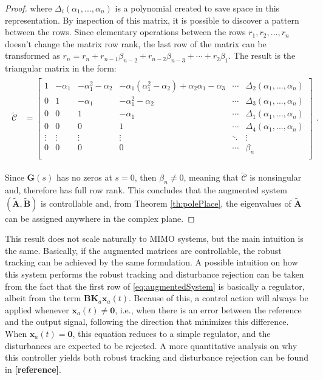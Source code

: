 \documentclass[a4paper,11pt]{book}
\numberwithin{figure}{chapter}
\numberwithin{equation}{chapter}
\numberwithin{table}{chapter}
\theoremstyle{definition}
\begin{document}
\begin{proof}
    \noindent where $\Delta_i(\alpha_1,...,\alpha_n)$ is a polynomial created to save space in this representation. By inspection of this matrix, it is possible to discover a pattern between the rows. Since elementary operations between the rows ${r_1, r_2, ..., r_n}$ doesn't change the matrix row rank, the last row of the matrix can be transformed as $r_n = r_n + r_{n-1}\beta_{n-2} + r_{n-2}\beta_{n-3} + \cdots + r_{2}\beta_{1}$. The result is the triangular matrix in the form:
    \begin{align}
    \begin{split}
        \tilde{\bm{\mathcal{C}}} &= 
            \begin{bmatrix}
                1 & -\alpha_1 & -\alpha_1^2 - \alpha_2 & -\alpha_1(\alpha_1^2 - \alpha_2) + \alpha_2 \alpha_1 - \alpha_3 & \cdots & \Delta_2(\alpha_1,...,\alpha_n) \\
                0 & 1 & -\alpha_1 & -\alpha_1^2 - \alpha_2  & \cdots & \Delta_3(\alpha_1,...,\alpha_n) \\
                0 & 0 & 1 & -\alpha_1  & \cdots & \Delta_1(\alpha_1,...,\alpha_n) \\
                0 & 0 & 0 & 1 &  \cdots & \Delta_4(\alpha_1,...,\alpha_n) \\
                \vdots & \vdots & \vdots & \vdots & \ddots & \vdots \\
                0 & 0 & 0 & 0  & \cdots & \beta_n \\
            \end{bmatrix}
    \end{split}
    .\end{align}
    
    Since $\bm{G}(s)$ has no zeros at $s = 0$, then $\beta_n \neq 0$, meaning that $\tilde{\bm{\mathcal{C}}}$ is nonsingular and, therefore has full row rank. This concludes that the augmented system $(\tilde{\bm{A}}, \tilde{\bm{B}})$ is controllable and, from Theorem \ref{th:polePlace}, the eigenvalues of $\tilde{\bm{A}}$ can be assigned anywhere in the complex plane.
\end{proof}

This result does not scale naturally to MIMO systems, but the main intuition is the same. Basically, if the augmented matrices are controllable, the robust tracking can be achieved by the same formulation. A possible intuition on how this system performs the robust tracking and disturbance rejection can be taken from the fact that the first row of \eqref{eq:augmentedSystem} is basically a regulator, albeit from the term $\bm{B} \bm{K}_a \bm{x}_a(t)$. Because of this, a control action will always be applied whenever $\bm{x}_a(t) \neq \bm{0}$, i.e., when there is an error between the reference and the output signal, following the direction that minimizes this difference. When $\bm{x}_a(t) = \bm{0}$, this equation reduces to a simple regulator, and the disturbances are expected to be rejected. A more quantitative analysis on why this controller yields both robust tracking and disturbance rejection can be found in \textbf{[reference]}. 
\end{document}

